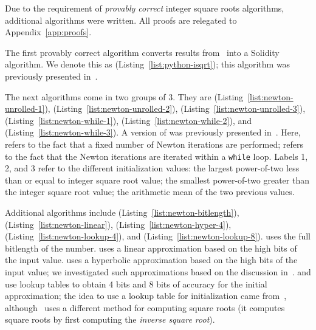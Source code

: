 Due to the requirement of \emph{provably correct}
integer square roots algorithms,
additional algorithms were written.
All proofs are relegated to Appendix~\ref{app:proofs}.

The first provably correct algorithm converts results from~\cite{PythonIsqrt}
into a Solidity algorithm.
We denote this as
\python{} (Listing~\ref{list:python-isqrt});
this algorithm was previously presented in~\cite{EfficientIsqrt}.

The next algorithms come in two groups of 3.
They are
\UnrolledOne{} (Listing~\ref{list:newton-unrolled-1}),
\UnrolledTwo{} (Listing~\ref{list:newton-unrolled-2}),
\UnrolledThree{} (Listing~\ref{list:newton-unrolled-3}),
\WhileOne{} (Listing~\ref{list:newton-while-1}),
\WhileTwo{} (Listing~\ref{list:newton-while-2}), and
\WhileThree{} (Listing~\ref{list:newton-while-3}).
A version of \UnrolledThree{} was previously presented
in~\cite{EfficientIsqrt}.
Here, \unrolled{} refers to the fact that a fixed number of Newton iterations
are performed;
\while{} refers to the fact that the Newton iterations are iterated
within a \texttt{while} loop.
Labels 1, 2, and 3 refer to the different initialization values:
the largest power-of-two less than or equal to integer square root value;
the smallest power-of-two greater than the integer square root value;
the arithmetic mean of the two previous values.

Additional algorithms include
\BitLength{} (Listing~\ref{list:newton-bitlength}),
\Linear{} (Listing~\ref{list:newton-linear}),
\HyperFour{} (Listing~\ref{list:newton-hyper-4}),
\LookupFour{} (Listing~\ref{list:newton-lookup-4}), and
\LookupEight{} (Listing~\ref{list:newton-lookup-8}).
\BitLength{} uses the full bitlength of the number.
\Linear{} uses a linear approximation based on the high bits
of the input value.
\HyperFour{} uses a hyperbolic approximation
based on the high bits of the input value;
we investigated such approximations
based on the discussion in~\cite{WikiSqrtHyper}.
\LookupFour{} and \LookupEight{} use lookup tables
to obtain 4 bits and 8 bits of accuracy for the initial approximation;
the idea to use a lookup table for initialization
came from~\cite{WikiSqrtBinary,FormalVerIsqrt},
although~\cite{FormalVerIsqrt} uses a different method for
computing square roots
(it computes square roots by first computing the \emph{inverse square root}).














